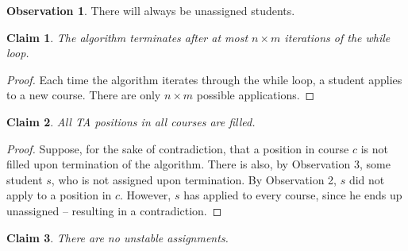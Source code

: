 \documentclass[11pt]{article}
\theoremstyle{definition}
\newtheorem{observation}{Observation}
\theoremstyle{plain}
\newtheorem{claim}{Claim}
\theoremstyle{indented-remark}
\theoremstyle{indented-proof}
\begin{document}
\begin{observation}
There will always be unassigned students.
\end{observation}

\begin{claim} 
The algorithm terminates after at most $n \times m$ iterations of the while loop.
\end{claim}

\begin{proof} 
Each time the algorithm iterates through the while loop, a student applies to a new course. There are only $n \times m$ possible applications.
\end{proof}

\begin{claim}
All TA positions in all courses are filled.
\end{claim}

\begin{proof}
Suppose, for the sake of contradiction, that a position in course $c$ is not filled upon termination of the algorithm. There is also, by Observation 3, some student $s$, who is not assigned upon termination. By Observation 2, $s$ did not apply to a position in $c$. However, $s$ has applied to every course, since he ends up unassigned -- resulting in a contradiction.
\end{proof} \newpage

\begin{claim}
There are no unstable assignments.
\end{claim}
\end{document}
